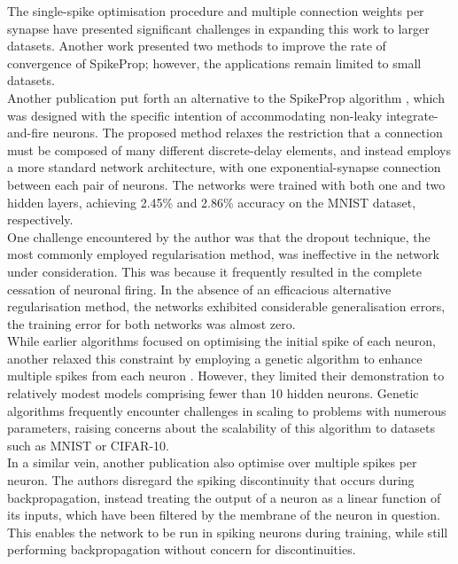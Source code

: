\noindent The single-spike optimisation procedure and multiple connection weights per synapse have presented significant challenges in expanding this work to larger datasets. Another work \cite{mckennoch2006fast} presented two methods to improve the rate of convergence of SpikeProp; however, the applications remain limited to small datasets. \\

\noindent Another publication put forth an alternative to the SpikeProp algorithm \cite{mostafa2017supervised}, which was designed with the specific intention of accommodating non-leaky integrate-and-fire neurons. The proposed method relaxes the restriction that a connection must be composed of many different discrete-delay elements, and instead employs a more standard network architecture, with one exponential-synapse connection between each pair of neurons. The networks were trained with both one and two hidden layers, achieving 2.45\% and 2.86\% accuracy on the MNIST dataset, respectively. \\

\noindent One challenge encountered by the author was that the dropout technique, the most commonly employed regularisation method, was ineffective in the network under consideration. This was because it frequently resulted in the complete cessation of neuronal firing. In the absence of an efficacious alternative regularisation method, the networks exhibited considerable generalisation errors, the training error for both networks was almost zero.\\

\noindent While earlier algorithms focused on optimising the initial spike of each neuron, another relaxed this constraint by employing a genetic algorithm to enhance multiple spikes from each neuron \cite{stromatias2015supervised}. However, they limited their demonstration to relatively modest models comprising fewer than 10 hidden neurons. Genetic algorithms frequently encounter challenges in scaling to problems with numerous parameters, raising concerns about the scalability of this algorithm to datasets such as MNIST or CIFAR-10.\\

\noindent In a similar vein, another publication \cite{lee2016training} also optimise over multiple spikes per neuron. The authors disregard the spiking discontinuity that occurs during backpropagation, instead treating the output of a neuron as a linear function of its inputs, which have been filtered by the membrane of the neuron in question. This enables the network to be run in spiking neurons during training, while still performing backpropagation without concern for discontinuities. \\


